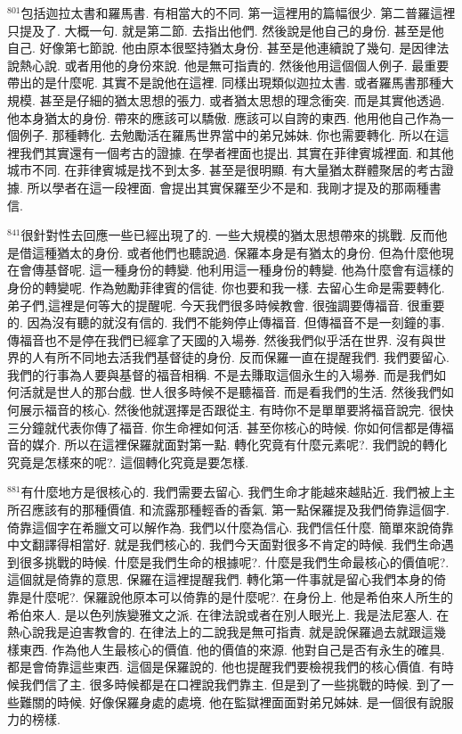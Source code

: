 \documentclass{book}
\begin{document}
$^{801}$包括迦拉太書和羅馬書.
有相當大的不同.
第一這裡用的篇幅很少.
第二普羅這裡只提及了.
大概一句.
就是第二節.
去指出他們.
然後說是他自己的身份.
甚至是他自己.
好像第七節說.
他由原本很堅持猶太身份.
甚至是他連續說了幾句.
是因律法說熱心說.
或者用他的身份來說.
他是無可指責的.
然後他用這個個人例子.
最重要帶出的是什麼呢.
其實不是說他在這裡.
同樣出現類似迦拉太書.
或者羅馬書那種大規模.
甚至是仔細的猶太思想的張力.
或者猶太思想的理念衝突.
而是其實他透過.
他本身猶太的身份.
帶來的應該可以驕傲.
應該可以自誇的東西.
他用他自己作為一個例子.
那種轉化.
去勉勵活在羅馬世界當中的弟兄姊妹.
你也需要轉化.
所以在這裡我們其實還有一個考古的證據.
在學者裡面也提出.
其實在菲律賓城裡面.
和其他城市不同.
在菲律賓城是找不到太多.
甚至是很明顯.
有大量猶太群體聚居的考古證據.
所以學者在這一段裡面.
會提出其實保羅至少不是和.
我剛才提及的那兩種書信.

$^{841}$很針對性去回應一些已經出現了的.
一些大規模的猶太思想帶來的挑戰.
反而他是借這種猶太的身份.
或者他們也聽說過.
保羅本身是有猶太的身份.
但為什麼他現在會傳基督呢.
這一種身份的轉變.
他利用這一種身份的轉變.
他為什麼會有這樣的身份的轉變呢.
作為勉勵菲律賓的信徒.
你也要和我一樣.
去留心生命是需要轉化.
弟子們,這裡是何等大的提醒呢.
今天我們很多時候教會.
很強調要傳福音.
很重要的.
因為沒有聽的就沒有信的.
我們不能夠停止傳福音.
但傳福音不是一刻鐘的事.
傳福音也不是停在我們已經拿了天國的入場券.
然後我們似乎活在世界.
沒有與世界的人有所不同地去活我們基督徒的身份.
反而保羅一直在提醒我們.
我們要留心.
我們的行事為人要與基督的福音相稱.
不是去賺取這個永生的入場券.
而是我們如何活就是世人的那台戲.
世人很多時候不是聽福音.
而是看我們的生活.
然後我們如何展示福音的核心.
然後他就選擇是否跟從主.
有時你不是單單要將福音說完.
很快三分鐘就代表你傳了福音.
你生命裡如何活.
甚至你核心的時候.
你如何信都是傳福音的媒介.
所以在這裡保羅就面對第一點.
轉化究竟有什麼元素呢?.
我們說的轉化究竟是怎樣來的呢?.
這個轉化究竟是要怎樣.

$^{881}$有什麼地方是很核心的.
我們需要去留心.
我們生命才能越來越貼近.
我們被上主所召應該有的那種價值.
和流露那種輕香的香氣.
第一點保羅提及我們倚靠這個字.
倚靠這個字在希臘文可以解作為.
我們以什麼為信心.
我們信任什麼.
簡單來說倚靠中文翻譯得相當好.
就是我們核心的.
我們今天面對很多不肯定的時候.
我們生命遇到很多挑戰的時候.
什麼是我們生命的根據呢?.
什麼是我們生命最核心的價值呢?.
這個就是倚靠的意思.
保羅在這裡提醒我們.
轉化第一件事就是留心我們本身的倚靠是什麼呢?.
保羅說他原本可以倚靠的是什麼呢?.
在身份上.
他是希伯來人所生的希伯來人.
是以色列族變雅文之派.
在律法說或者在別人眼光上.
我是法尼塞人.
在熱心說我是迫害教會的.
在律法上的二說我是無可指責.
就是說保羅過去就跟這幾樣東西.
作為他人生最核心的價值.
他的價值的來源.
他對自己是否有永生的確具.
都是會倚靠這些東西.
這個是保羅說的.
他也提醒我們要檢視我們的核心價值.
有時候我們信了主.
很多時候都是在口裡說我們靠主.
但是到了一些挑戰的時候.
到了一些難關的時候.
好像保羅身處的處境.
他在監獄裡面面對弟兄姊妹.
是一個很有說服力的榜樣.
\end{document}
